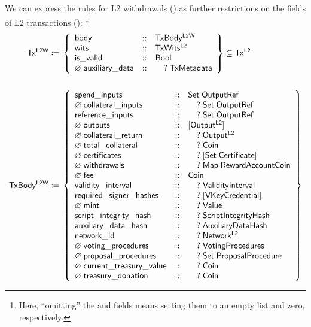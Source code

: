 \documentclass[../hydrozoa.tex]{subfiles}
\begin{document}
We can express the rules for L2 withdrawals () as further restrictions on the fields of L2 transactions  ():%
\footnote{Here, ``omitting'' the  and  fields means setting them to an empty list and zero, respectively.}
\begingroup
\allowdisplaybreaks
\begin{align*}
  \mathsf{Tx^{L2W}} \coloneq\;& \left\{
    \begin{array}{lll}
      \mathsf{body} &::& \mathsf{TxBody^{L2W}} \\
        \mathsf{wits} &::& \mathsf{TxWits^{L2}} \\
        \mathsf{is\_valid} &::& \mathsf{Bool} \\
        \varnothing\;\mathsf{auxiliary\_data} &::& \quad?\;\mathsf{TxMetadata}
    \end{array} \right\} \subseteq \mathsf{Tx^{L2}} \\\\
    \mathsf{TxBody^{L2W}} \coloneq\;& \left\{
    \begin{array}{lll}
      \mathsf{spend\_inputs} &::& \mathsf{Set \; OutputRef} \\
        \varnothing\;\mathsf{collateral\_inputs} &::& \quad?\;\mathsf{Set \; OutputRef} \\
        \mathsf{reference\_inputs} &::& \quad?\;\mathsf{Set \; OutputRef} \\
        \varnothing\;\mathsf{outputs} &::& \mathsf{[Output^{L2}]} \\
        \varnothing\;\mathsf{collateral\_return} &::& \quad?\;\mathsf{Output^{L2}} \\
        \varnothing\;\mathsf{total\_collateral} &::& \quad?\;\mathsf{Coin} \\
        \varnothing\;\mathsf{certificates} &::& \quad?\;\mathsf{[ Set \; Certificate ]} \\
        \varnothing\;\mathsf{withdrawals} &::& \quad?\;\mathsf{Map \; RewardAccount Coin} \\
        \varnothing\;\mathsf{fee} &::& \mathsf{Coin} \\
        \mathsf{validity\_interval} &::& \quad?\;\mathsf{ValidityInterval} \\
        \mathsf{required\_signer\_hashes} &::& \quad?\;\mathsf{[VKeyCredential]} \\
        \varnothing\;\mathsf{mint} &::& \quad?\;\mathsf{Value} \\
        \mathsf{script\_integrity\_hash} &::& \quad?\;\mathsf{ScriptIntegrityHash} \\
        \mathsf{auxiliary\_data\_hash} &::& \quad?\;\mathsf{AuxiliaryDataHash} \\
        \mathsf{network\_id} &::& \quad?\;\mathsf{Network^{L2}} \\
        \varnothing\;\mathsf{voting\_procedures} &::& \quad?\;\mathsf{VotingProcedures} \\
        \varnothing\;\mathsf{proposal\_procedures} &::& \quad?\;\mathsf{Set \; ProposalProcedure} \\
        \varnothing\;\mathsf{current\_treasury\_value} &::& \quad?\;\mathsf{Coin} \\
        \varnothing\;\mathsf{treasury\_donation} &::& \quad?\;\mathsf{Coin}
    \end{array} \right\}
\end{align*}
\endgroup
\end{document}

